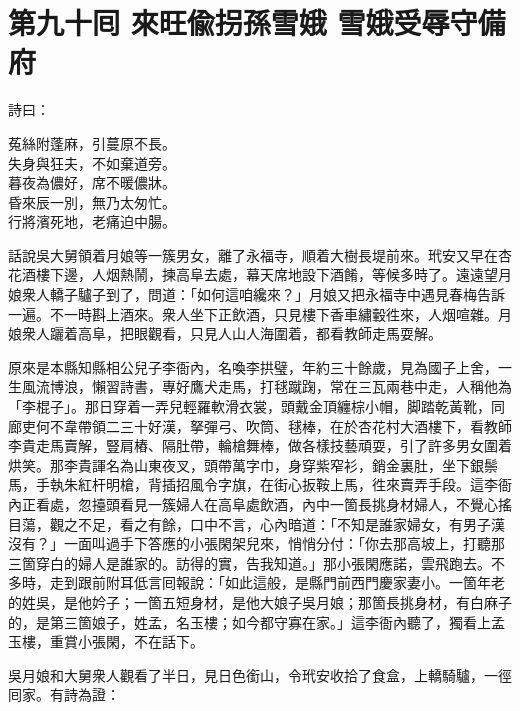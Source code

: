 
\chapter*{第九十囘 來旺偸拐孫雪娥 雪娥受辱守備府}


詩曰：

\begin{myquote}
菟絲附蓬麻，引蔓原不長。\\失身與狂夫，不如棄道旁。\\暮夜為儂好，席不暖儂牀。\\昏來辰一別，無乃太匆忙。\\行將濱死地，老痛迫中腸。
\end{myquote}

話說吳大舅領着月娘等一簇男女，離了永福寺，順着大樹長堤前來。玳安又早在杏花酒樓下邊，人烟熱鬧，揀高阜去處，幕天席地設下酒餚，等候多時了。遠遠望月娘衆人轎子驢子到了，問道：「如何這咱纔來？」月娘又把永福寺中遇見春梅告訴一遍。不一時斟上酒來。衆人坐下正飲酒，只見樓下香車繡轂徃來，人烟喧雜。月娘衆人躧着高阜，把眼觀看，只見人山人海圍着，都看教師走馬耍解。

原來是本縣知縣相公兒子李衙內，名喚李拱璧，年約三十餘歲，見為國子上舍，一生風流博浪，懶習詩書，專好鷹犬走馬，打毬蹴踘，常在三瓦兩巷中走，人稱他為「李棍子」。那日穿着一弄兒輕羅軟滑衣裳，頭戴金頂纏棕小帽，脚踏乾黃靴，同廊吏何不韋帶領二三十好漢，拏彈弓、吹筒、毬棒，在於杏花村大酒樓下，看教師李貴走馬賣解，豎肩樁、隔肚帶，輪槍舞棒，做各樣技藝頑耍，引了許多男女圍着烘笑。那李貴諢名為山東夜叉，頭帶萬字巾，身穿紫窄衫，銷金裏肚，坐下銀鬃馬，手執朱紅杆明槍，背插招風令字旗，在街心扳鞍上馬，徃來賣弄手段。這李衙內正看處，忽擡頭看見一簇婦人在高阜處飲酒，內中一箇長挑身材婦人，不覺心搖目蕩，觀之不足，看之有餘，口中不言，心內暗道：「不知是誰家婦女，有男子漢沒有？」{}一面叫過手下答應的小張閑架兒來，悄悄分付：「你去那高坡上，打聽那三箇穿白的婦人是誰家的。訪得的實，告我知道。」那小張閑應諾，雲飛跑去。不多時，走到跟前附耳低言囘報說：「如此這般，是縣門前西門慶家妻小。一箇年老的姓吳，是他妗子；一箇五短身材，是他大娘子吳月娘；那箇長挑身材，有白麻子的，是第三箇娘子，姓孟，名玉樓；如今都守寡在家。」這李衙內聽了，獨看上孟玉樓，重賞小張閑，不在話下。

吳月娘和大舅衆人觀看了半日，見日色銜山，令玳安收拾了食盒，上轎騎驢，一徑囘家。有詩為證：

